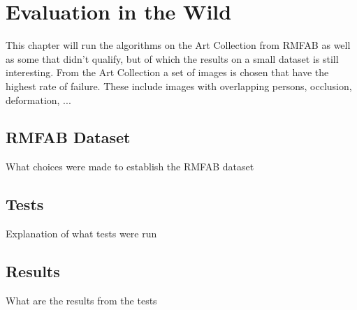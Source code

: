 \chapter{Evaluation in the Wild}
This chapter will run the algorithms on the Art Collection from \gls{RMFAB}
as well as some that didn't qualify, but of which the results on a small dataset is still interesting.
From the Art Collection a set of images is chosen that have the highest rate of failure.
These include images with overlapping persons, occlusion, deformation, ...

\section{RMFAB Dataset}
What choices were made to establish the RMFAB dataset

\section{Tests}
Explanation of what tests were run

\section{Results}
What are the results from the tests